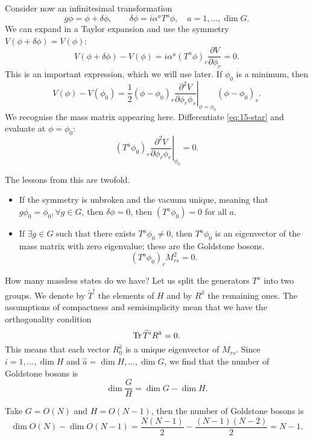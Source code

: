 Consider now an infinitesimal transformation 
\begin{equation}
  g \phi = \phi + \delta \phi, \qquad \delta \phi = i \alpha^{a} T^{a} \phi, \quad a = 1, \dots, \dim G.
\end{equation}
We can expand in a Taylor expansion and use the symmetry $V(\phi + \delta \phi) = V(\phi)$:
\begin{equation}
  \label{eq:15-star}
  V(\phi + \delta \phi) - V(\phi) = i \alpha^{a} (T^{a} \phi)_r \frac{\partial V}{\partial \phi_r} = 0.
\end{equation}
This is an important expression, which we will use later.
If $\phi_0$ is a minimum, then
\begin{equation}
  V(\phi) - V(\phi_0) = \frac{1}{2}(\phi - \phi_0)_{r} \left.\frac{\partial^2 V}{\partial \phi_r \phi_s} \right\rvert_{\phi = \phi_0} (\phi - \phi_0)_s.
\end{equation}
We recognise the mass matrix appearing here.
Differentiate \eqref{eq:15-star} and evaluate at $\phi = \phi_0$:
\begin{equation}
(T^{a} \phi_0)_r \left.\frac{\partial^2 V}{\partial \phi_r \phi_r} \right\rvert_{\phi_0} = 0.
\end{equation}

The lessons from this are twofold.
\begin{itemize}
  \item If the symmetry is unbroken and the vacuum unique, meaning that $g \phi_0 = \phi_0, \forall g \in G$, then $\delta \phi = 0$, then $(T^{a} \phi_0) = 0$ for all $a$.
  \item If $\exists g \in G$ such that there exists $T^a \phi_0 \neq 0$, then $T^a \phi_0$ is an eigenvector of the mass matrix with zero eigenvalue; these are the Goldstone bosons.
    \begin{equation}
      (T^a \phi_0)_r M^2_{rs} = 0.
    \end{equation}
\end{itemize}
How many massless states do we have?
Let us split the generators $T^a$ into two groups. We denote by $\widetilde{T}^i$ the elements of $H$ and by $R^{\hat{a}}$ the remaining ones.
The assumptions of compactness and semisimplicity mean that we have the orthogonality condition
\begin{equation}
  \Tr \widetilde{T}^i R^{\hat{a}} = 0.
\end{equation}
This means that each vector $R^{\hat{a}}_0$ is a unique eigenvector of $M_{rs}$.
Since $i = 1, \dots, \dim H$ and $\hat{a} = \dim H, \dots, \dim G$, we find that the number of Goldstone bosons is
\begin{equation}
  \dim \frac{G}{H} = \dim G - \dim H.
\end{equation}

\begin{example}[$O(N)$]
  Take $G = O(N)$ and $H = O(N-1)$, then the number of Goldstone bosons is
  \begin{equation}
    \dim O(N) - \dim O(N-1) = \frac{N (N-1)}{2} - \frac{(N-1)(N-2)}{2} = N-1.
  \end{equation}
\end{example}
